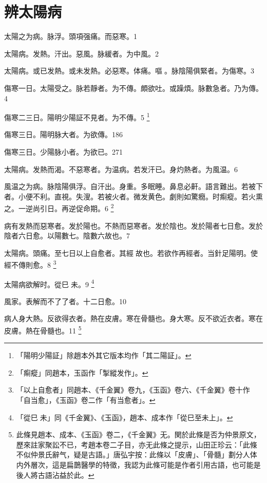 \chapter{辨太陽病}

太陽之为病。{\khaaitp 脉浮。}頭項强痛。而惡寒。1

太陽病。发熱。汗出。惡風。脉緩者。为中風。2

%

太陽病。或已发熱。或未发熱。必惡寒。体痛。嘔{\sungtpii 𠱘}。脉陰陽俱緊者。为傷寒。3


傷寒一日。太陽受之。脉若靜者。为不傳。頗欲吐。或躁煩。脉數急者。乃为傳。4

傷寒{\khaaitp 二三日}。陽明少陽証不見者。为不傳。5
	\footnote{
		「陽明少陽証」除趙本外其它版本均作「其二陽証」。
	}

傷寒三日。陽明脉大{\khaaitp 者。为欲傳}。186

傷寒三日。少陽脉小者。为欲已。271


太陽病。发熱而渴。不惡寒者。为温病。若发汗已。身灼熱者。为風温。6

風温{\khaaitp 之}为病。脉陰陽俱浮。自汗出。身重。多眠睡。鼻息必鼾。語言難出。若被下者。小便不利。直視。失溲。若被火者。微发黄{\khaaitp 色}。劇則如驚癇。时痸瘲。若火熏之。一逆尚引日。再逆促命期。6
	\footnote{
		「痸瘲」同趙本，玉函作「掣縱发作」。
	}

病有发熱而惡寒者。发於陽也。不熱而惡寒者。发於陰也。发於陽者七日愈。发於陰者六日愈。以陽數七。陰數六故也。7

太陽病。頭痛。至七日以上自愈者。其經{\sungtpii 𥁞}故也。若欲作再經者。当針足陽明。使經不傳則愈。8
	\footnote{
		「以上自愈者」同趙本、《千金翼》卷九，《玉函》卷六、《千金翼》卷十作「自当愈」，《玉函》卷二作「有当愈者」。
	}

太陽病欲解时。從巳{\sungtpii 𥁞}未。9
	\footnote{
		「從巳{\sungtpii 𥁞}未」同《千金翼》、《玉函》，趙本、成本作「從巳至未上」。
	}

風家。表解而不了了者。十二日愈。10

病人身大熱。反欲得衣者。熱在皮膚。寒在骨髓也。身大寒。反不欲近衣者。寒在皮膚。熱在骨髓也。11
	\footnote{
		此條見趙本、成本、《玉函》卷二，《千金翼》无。関於此條是否为仲景原文，歷來註家聚訟不已，考趙本卷二子目，亦无此條之提示，山田正珍云：「此條不似仲景氏辭气，疑是古語。」唐弘宇按：此條以「皮膚」、「骨髓」劃分人体内外層次，這是扁鵲醫學的特徵，我認为此條可能是作者引用古語，也可能是後人將古語沾益於此。
	}

